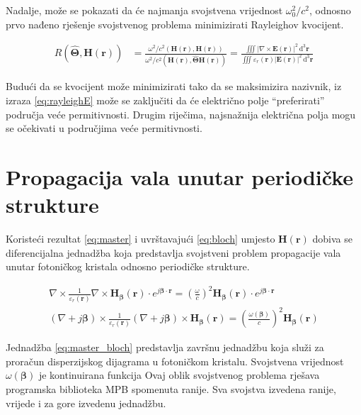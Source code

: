 \documentclass[utf8, seminar, numeric]{fer}
\begin{document}
Nadalje, može se pokazati da će najmanja svojstvena vrijednost $\omega_0^2/c^2$,
odnosno prvo nađeno rješenje svojstvenog problema minimizirati Rayleighov
kvocijent.

\begin{align}
	R \left( \hat{\mathbf{\Theta}}, \mathbf{H}(\mathbf{r}) \right)
	&= \frac{
		\omega^2/c^2
		\left(
			\mathbf{H}(\mathbf{r}), \mathbf{H}(\mathbf{r})
		\right)
	}
	{
		\omega^2/c^2
		\left(
			\mathbf{H}(\mathbf{r}), \hat{\mathbf{\Theta}}\mathbf{H}(\mathbf{r})
		\right)
	}
	= \frac{
		\iiint |\nabla \times \mathbf{E}(\mathbf{r})|^2
		\, \mathrm{d}^3\mathbf{r}}
	{\iiint \varepsilon_r(\mathbf{r}) | \mathbf{E}( \mathbf{r} ) |^2
	\, \mathrm{d}^3\mathbf{r}} \label{eq:rayleighE}
\end{align}

Budući da se kvocijent može minimizirati tako da se maksimizira nazivnik, iz
izraza \ref{eq:rayleighE} može se zaključiti da će električno polje
``preferirati'' područja veće permitivnosti. Drugim riječima,
najsnažnija električna polja mogu se očekivati u područjima veće permitivnosti.


\section{Propagacija vala unutar periodičke strukture}

Koristeći rezultat \ref{eq:master} i uvrštavajući \ref{eq:bloch} umjesto
$\mathbf{H}(\mathbf{r})$ dobiva se diferencijalna jednadžba koja predstavlja
svojstveni problem propagacije vala unutar fotoničkog kristala odnosno
periodičke strukture.

\begin{align} \label{eq:master_bloch}
	\nabla \times
	\frac{1}{\varepsilon_r(\mathbf{r})} \nabla \times
	\mathbf{H}_{\bm{\beta}}(\mathbf{r}) \cdot
	e^{j {\bm{\beta}} \cdot \mathbf{r}}
	= \left(
		\frac{\omega}{c}
	\right)^2
	\mathbf{H}_{\bm{\beta}}(\mathbf{r}) \cdot
		e^{j {\bm{\beta}} \cdot \mathbf{r}}	\nonumber \\
	(\nabla + j{\bm{\beta}}) \times
	\frac{1}{\varepsilon_r(\mathbf{r})}
	(\nabla + j{\bm{\beta}}) \times
	\mathbf{H}_{\bm{\beta}}(\mathbf{r})
	= \left(
	\frac{\omega ({\bm{\beta}})}{c}
	\right)^2
	\mathbf{H}_{\bm{\beta}}(\mathbf{r})
\end{align}

Jednadžba \ref{eq:master_bloch} predstavlja završnu jednadžbu koja služi za
proračun disperzijskog dijagrama u fotoničkom kristalu. Svojstvena vrijednost
${\omega ({\bm{\beta}})}$ je kontinuirana funkcija
Ovaj oblik
svojstvenog problema rješava programska biblioteka MPB spomenuta ranije. Sva
svojstva izvedena ranije, vrijede i za gore izvedenu jednadžbu.
\end{document}
